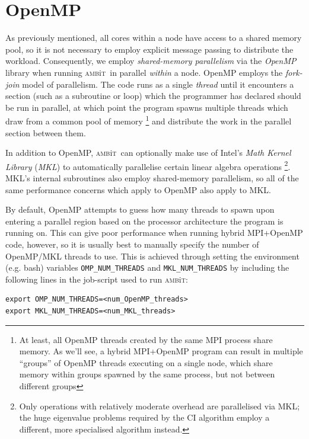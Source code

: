 \documentclass{report}
\newcommand{\ambit}{\textsc{amb}{\footnotesize i}\textsc{t}}
\begin{document}
\section{OpenMP}
\label{sec:OpenMP}
As previously mentioned, all cores within a node have access to a shared memory pool, so it is not
necessary to employ explicit message passing to distribute the workload. Consequently, we employ
\textit{shared-memory parallelism} via the \textit{OpenMP} library when running \ambit ~in parallel
\emph{within} a node. OpenMP employs the \textit{fork-join} model of parallelism. The code runs as a 
single \textit{thread} until it encounters a section (such as a subroutine or loop) which the programmer 
has declared should be run in parallel, at which point the program spawns multiple threads
which draw from a common pool of memory \footnote{At least, all OpenMP threads created by the same MPI 
process share memory. As we'll see, a hybrid MPI+OpenMP program can result in multiple ``groups'' of 
OpenMP threads executing on a single node, which share memory within groups spawned by the same process, 
but not between different groups} and distribute the work in the parallel section between them. 

In addition to OpenMP, \ambit ~can optionally make use of Intel's \textit{Math Kernel Library} 
(\textit{MKL}) to automatically parallelise certain linear algebra operations \footnote{Only operations 
with relatively moderate overhead are parallelised via MKL; the huge eigenvalue problems required by the
CI algorithm employ a different, more specialised algorithm instead.}. MKL's internal subroutines also
employ shared-memory parallelism, so all of the same performance concerns which apply to OpenMP also
apply to MKL.

By default, OpenMP attempts to guess how many threads to spawn upon entering a parallel region based on
the processor architecture the program is running on. This can give poor performance when running hybrid
MPI+OpenMP code, however, so it is usually best to manually specify the number of OpenMP/MKL threads to
use. This is achieved through setting the environment (e.g. bash) variables \texttt{OMP\_NUM\_THREADS} 
and \texttt{MKL\_NUM\_THREADS} by including the following lines in the job-script used to run \ambit:

\begin{verbatim}
export OMP_NUM_THREADS=<num_OpenMP_threads>
export MKL_NUM_THREADS=<num_MKL_threads>
\end{verbatim}
\end{document}
